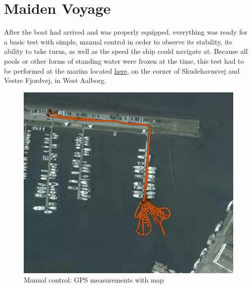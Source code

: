\chapter{Maiden Voyage}

After the boat had arrived and was properly equipped, everything was ready for a basic test with simple, manual control in order to observe its stability, its ability to take turns, as well as the speed the ship could navigate at. Because all pools or other forms of standing water were frozen at the time, this test had to be performed at the marina located \href{https://maps.google.com/?ll=57.058301,9.896772&spn=0.003495,0.009645&t=h&z=17""}{here}, on the corner of Skudehavnsvej and Vestre Fjordvej, in West Aalborg. 

\begin{figure}[htpb]
	
		\includegraphics[width=\textwidth]{img/maidenVoyage/pointsOnMap}
		\caption{Manual control: GPS measurements with map} 
		\label{fig:pointsOnMap}
	
\end{figure}

